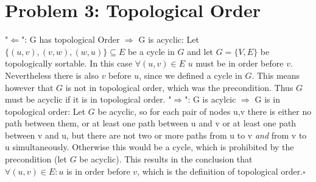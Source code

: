 \documentclass[a4paper]{article}
\begin{document}
\section{Problem 3: Topological Order}
"$\Leftarrow$": G has topological Order $\Rightarrow$ G is acyclic:\newline
Let $\{(u,v),(v,w),(w,u)\}\subseteq E$ be a cycle in $G$ and let $G = \{V,E\}$ be topologically sortable. In this case $\forall (u,v ) \in E$ $u$ must be in order before $v$. Nevertheless there is also $v$ before $u$, since we defined a cycle in $G$. This means however that $G$ is not in topological order, which was the precondition. Thus $G$ must be acyclic if it is in topological order.\newline
"$\Rightarrow$": G is acylcic $\Rightarrow$ G is in topological order:\newline
Let $G$ be acyclic, so for each pair of nodes u,v there is either no path between them, or at least one path between u and v or at least one path between v and u, but there are not two or more paths from u to v \textit{and} from v to u simultaneously. Otherwise this would be a cycle, which is prohibited by the precondition (let $G$ be acyclic). This results in the conclusion that $\forall (u,v)\in E: u$ is in order before $v$, which is the definition of topological order.\newline $\square$
\end{document}
